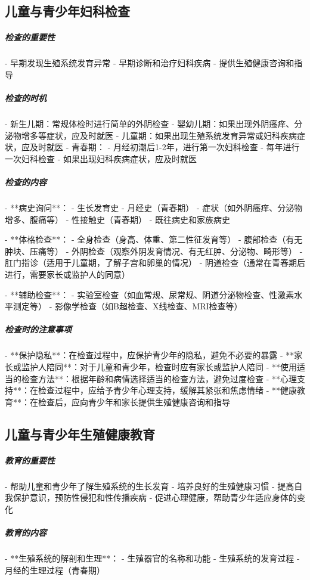 \begin{enumerate}
\subsection{儿童与青少年妇科检查}

\subparagraph{检查的重要性}

- 早期发现生殖系统发育异常
- 早期诊断和治疗妇科疾病
- 提供生殖健康咨询和指导

\subparagraph{检查的时机}

- 新生儿期：常规体检时进行简单的外阴检查
- 婴幼儿期：如果出现外阴瘙痒、分泌物增多等症状，应及时就医
- 儿童期：如果出现生殖系统发育异常或妇科疾病症状，应及时就医
- 青春期：
  - 月经初潮后1-2年，进行第一次妇科检查
  - 每年进行一次妇科检查
  - 如果出现妇科疾病症状，应及时就医

\subparagraph{检查的内容}

- **病史询问**：
  - 生长发育史
  - 月经史（青春期）
  - 症状（如外阴瘙痒、分泌物增多、腹痛等）
  - 性接触史（青春期）
  - 既往病史和家族病史

- **体格检查**：
  - 全身检查（身高、体重、第二性征发育等）
  - 腹部检查（有无肿块、压痛等）
  - 外阴检查（观察外阴发育情况、有无红肿、分泌物、畸形等）
  - 肛门指诊（适用于儿童期，了解子宫和卵巢的情况）
  - 阴道检查（通常在青春期后进行，需要家长或监护人的同意）

- **辅助检查**：
  - 实验室检查（如血常规、尿常规、阴道分泌物检查、性激素水平测定等）
  - 影像学检查（如B超检查、X线检查、MRI检查等）

\subparagraph{检查时的注意事项}

- **保护隐私**：在检查过程中，应保护青少年的隐私，避免不必要的暴露
- **家长或监护人陪同**：对于儿童和青少年，检查时应有家长或监护人陪同
- **使用适当的检查方法**：根据年龄和病情选择适当的检查方法，避免过度检查
- **心理支持**：在检查过程中，应给予青少年心理支持，缓解其紧张和焦虑情绪
- **健康教育**：在检查后，应向青少年和家长提供生殖健康咨询和指导

\subsection{儿童与青少年生殖健康教育}

\subparagraph{教育的重要性}

- 帮助儿童和青少年了解生殖系统的生长发育
- 培养良好的生殖健康习惯
- 提高自我保护意识，预防性侵犯和性传播疾病
- 促进心理健康，帮助青少年适应身体的变化

\subparagraph{教育的内容}

- **生殖系统的解剖和生理**：
  - 生殖器官的名称和功能
  - 生殖系统的发育过程
  - 月经的生理过程（青春期）


\end{enumerate}
